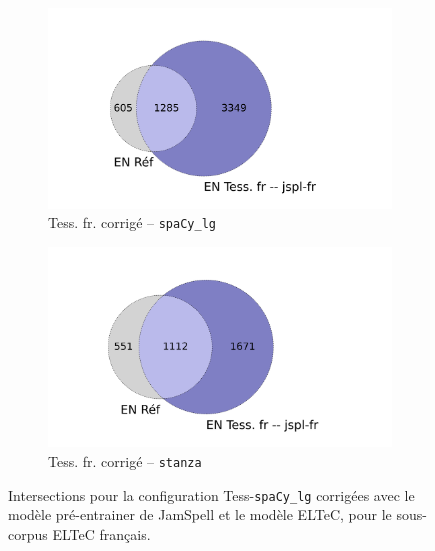 \begin{figure}[h!]
\begin{minipage}{7cm}
\begin{subfigure}{1\textwidth}
  \end{subfigure}
    \end{minipage}
\begin{minipage}{7cm}
  \begin{subfigure}{1\textwidth}
  \includegraphics[width=1\textwidth]{IMAGES/INTERSECTIONS_GLOBALES/ELTeCFRA_Tess. fr -- jspl-fr_spacy-lg-concat_intersection.png} 
  \caption{Tess. fr. corrigé -- \texttt{spaCy\_lg}}
  \label{fig:ELTeCFRA_Tess. fr -- jspl-fr_spacy-lg-concat_intersection}
  \end{subfigure}
  \end{minipage}
  \begin{minipage}{7cm}
  \begin{subfigure}{1\textwidth}
  \includegraphics[width=1\textwidth]{IMAGES/INTERSECTIONS_GLOBALES/ELTeCFRA_Tess. fr -- jspl-fr_stanza-concat_intersection.png}
  \caption{Tess. fr. corrigé -- \texttt{stanza}}
  \label{fig:ELTeCFRA_Tess. fr -- jspl-fr_stanza-concat_intersection}
  \end{subfigure}
    \end{minipage}
\caption{Intersections pour la configuration Tess-\texttt{spaCy\_lg} corrigées avec le modèle pré-entrainer de JamSpell et le modèle ELTeC, pour le sous-corpus ELTeC français.}
\label{fig:intersection-globale-tess}
\end{figure}


